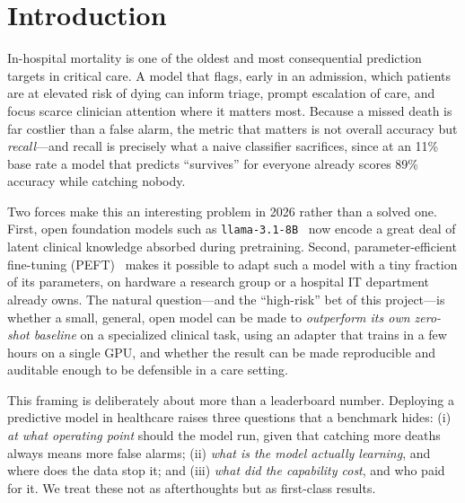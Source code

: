 \documentclass[sigconf,nonacm]{acmart}
\begin{document}

\maketitle

\section{Introduction}
In-hospital mortality is one of the oldest and most consequential prediction
targets in critical care. A model that flags, early in an admission, which
patients are at elevated risk of dying can inform triage, prompt escalation of
care, and focus scarce clinician attention where it matters most. Because a
missed death is far costlier than a false alarm, the metric that matters is
not overall accuracy but \emph{recall}---and recall is precisely what a naive
classifier sacrifices, since at an 11\% base rate a model that predicts
``survives'' for everyone already scores 89\% accuracy while catching nobody.

Two forces make this an interesting problem in 2026 rather than a solved one.
First, open foundation models such as \texttt{llama-3.1-8B}~\cite{llama3} now
encode a great deal of latent clinical knowledge absorbed during pretraining.
Second, parameter-efficient fine-tuning (PEFT)~\cite{lora,qlora} makes it
possible to adapt such a model with a tiny fraction of its parameters, on
hardware a research group or a hospital IT department already owns. The
natural question---and the ``high-risk'' bet of this project---is whether a
small, general, open model can be made to \emph{outperform its own zero-shot
baseline} on a specialized clinical task, using an adapter that trains in a few
hours on a single GPU, and whether the result can be made reproducible and
auditable enough to be defensible in a care setting.

This framing is deliberately about more than a leaderboard number. Deploying a
predictive model in healthcare raises three questions that a benchmark hides:
(i) \emph{at what operating point} should the model run, given that catching
more deaths always means more false alarms; (ii) \emph{what is the model
actually learning}, and where does the data stop it; and (iii) \emph{what did
the capability cost}, and who paid for it. We treat these not as afterthoughts
but as first-class results.
\end{document}
